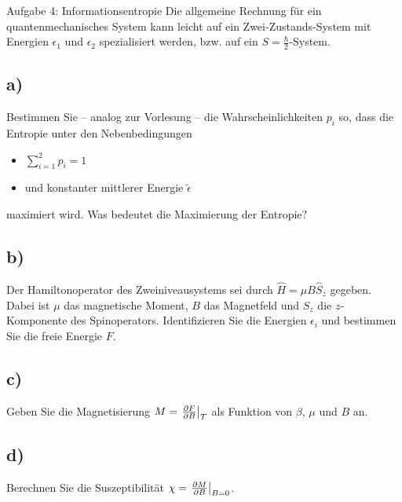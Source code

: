 \begin{aufgabe}{Aufgabe 4: Informationsentropie}
    Die allgemeine Rechnung für ein quantenmechanisches System kann leicht auf ein Zwei-Zustands-System mit Energien $\epsilon_1$ und $\epsilon_2$ spezialisiert werden,
    bzw. auf ein $S = \frac{\hbar}{2}$-System.

    \subsection{a)}
    Bestimmen Sie – analog zur Vorlesung – die Wahrscheinlichkeiten $p_i$ so,
    dass die Entropie unter den Nebenbedingungen
    \begin{itemize}
        \item $\displaystyle \sum_{i=1}^2{p_i} = 1$
        \item und konstanter mittlerer Energie $\tilde\epsilon$
    \end{itemize}
    maximiert wird.
    Was bedeutet die Maximierung der Entropie?

    \subsection{b)}
    Der Hamiltonoperator des Zweiniveausystems sei durch $\hat H = \mu B \hat S_z$ gegeben.
    Dabei ist $\mu$ das magnetische Moment,
    $B$ das Magnetfeld
    und $S_z$ die $z$-Komponente des Spinoperators.
    Identifizieren Sie die Energien $\epsilon_i$ und bestimmen Sie die freie Energie $F$.

    \subsection{c)}
    Geben Sie die Magnetisierung $M = \left.\frac{\partial F}{\partial B}\right\rvert_{T}$ als Funktion von $\beta$, $\mu$ und $B$ an.

    \subsection{d)}
    Berechnen Sie die Suszeptibilität $\chi = \left.\frac{\partial M}{\partial B}\right\rvert_{B=0}$.
\end{aufgabe}

